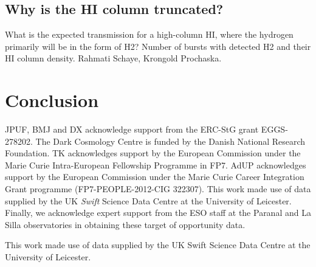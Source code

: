 \documentclass{aa}    %
\begin{document}
%
	
	
	
\subsection{Why is the HI column truncated?}

What is the expected transmission for a high-column HI, where the hydrogen primarily will be in the form of H2? Number of bursts with detected H2 and their HI column density. Rahmati Schaye, Krongold Prochaska. 



\section{Conclusion}





\begin{acknowledgements}
	JPUF, BMJ and DX acknowledge support from the ERC-StG grant EGGS-278202.  The
	Dark Cosmology Centre is funded by the Danish National Research Foundation.  TK
	acknowledges support by the European Commission under the Marie Curie
	Intra-European Fellowship Programme in FP7.  AdUP acknowledges support by the
	European Commission under the Marie Curie Career Integration Grant programme
	(FP7-PEOPLE-2012-CIG 322307).  This work made use of data supplied by the UK
	{\it Swift} Science Data Centre at the University of Leicester.  Finally, we
	acknowledge expert support from the ESO staff at the Paranal and La Silla
	observatories in obtaining these target of opportunity data.


This work made use of data supplied by the UK Swift Science Data Centre at the University of Leicester.
\end{acknowledgements}
\end{document}
